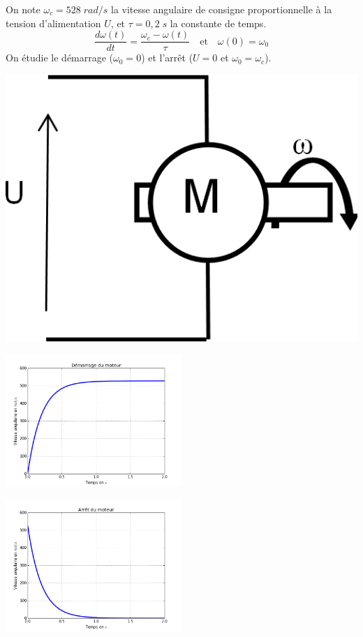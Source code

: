 \documentclass[10pt]{article}
\begin{document}
\begin{minipage}[c]{.65\linewidth}
On note $\omega_c = 528\; rad/s$ la vitesse angulaire de consigne proportionnelle à la tension d'alimentation $U$, et $\tau=0,2\; s$ la constante de temps.
$$ \dfrac{d\omega(t)}{dt} = \dfrac{\omega_c-\omega(t)}{\tau} \quad \text{et} \quad \omega(0)=\omega_0
$$
On étudie le démarrage ($\omega_0=0$) et l'arrêt ($U=0$ et $\omega_0=\omega_c$).

\end{minipage} \hfill
\begin{minipage}[c]{.3\linewidth}
\begin{center}
\includegraphics[width=.95\textwidth]{images/fig_01}
\end{center}
\end{minipage}

\begin{minipage}[c]{.47\linewidth}
\begin{center}
\includegraphics[height=5cm]{images/fig_02_bis}
\end{center}
\end{minipage}
\hfill
\begin{minipage}[c]{.47\linewidth}
\begin{center}
\includegraphics[height=5cm]{images/fig_03_bis}
\end{center}
\end{minipage}
\end{document}
